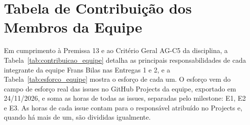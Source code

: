 \documentclass[journal]{IEEEtran}
\begin{document}



\appendices

\section{Tabela de Contribuição dos Membros da Equipe}
\label{app:contribuicao}

Em cumprimento à Premissa 13 e ao Critério Geral AG-C5 da disciplina, a Tabela~\ref{tab:contribuicao_equipe} detalha as principais responsabilidades de cada integrante da equipe Frans Bilas nas Entregas 1 e 2, e a Tabela~\ref{tab:esforco_equipe} mostra o esforço de cada um. O esforço vem do campo de esforço real das issues no GitHub Projects da equipe, exportado em 24/11/2026, e soma as horas de todas as issues, separadas pelo milestone: E1, E2 e E3. As horas de cada issue contam para o responsável atribuído no Projects e, quando há mais de um, são divididas igualmente.
\end{document}
